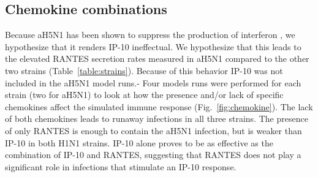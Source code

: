\documentclass[10pt]{article}
\begin{document}
\subsection*{Chemokine combinations}

Because aH5N1 has been shown to suppress the production of interferon \cite{Mitchell2011}, we hypothesize that it renders IP-10 ineffectual.  We hypothesize that this leads to the elevated RANTES secretion rates measured in aH5N1 compared to the other two strains (Table~\ref{table:strains}).  Because of this behavior IP-10 was not included in the aH5N1 model runs.-
Four models runs were performed for each strain (two for aH5N1) to look at how the presence and/or lack of specific chemokines affect the simulated immune response (Fig.~\ref{fig:chemokine}).  The lack of both chemokines leads to runaway infections in all three strains.  The presence of only RANTES is enough to contain the aH5N1 infection, but is weaker than IP-10 in both H1N1 strains.  IP-10 alone proves to be as effective as the combination of IP-10 and RANTES, suggesting that RANTES does not play a significant role in infections that stimulate an IP-10 response.
\end{document}
